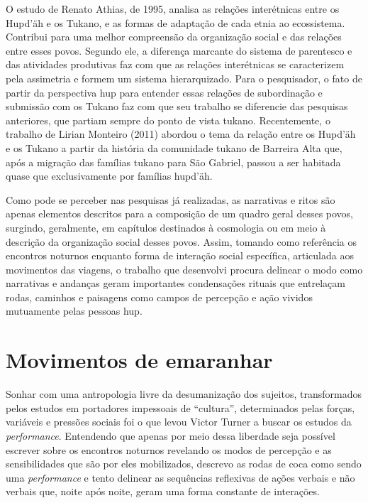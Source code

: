 O estudo de Renato Athias, de 1995, analisa as relações interétnicas
entre os Hupd'äh e os Tukano, e as formas de adaptação de cada etnia ao
ecossistema. Contribui para uma melhor compreensão da organização social
e das relações entre esses povos. Segundo ele, a diferença marcante do
sistema de parentesco e das atividades produtivas faz com que as
relações interétnicas se caracterizem pela assimetria e formem um
sistema hierarquizado. Para o pesquisador, o fato de partir da
perspectiva hup para entender essas relações de subordinação e submissão
com os Tukano faz com que seu trabalho se diferencie das pesquisas
anteriores, que partiam sempre do ponto de vista tukano. Recentemente, o
trabalho de Lirian Monteiro (2011) abordou o tema da relação entre os
Hupd'äh e os Tukano a partir da história da comunidade tukano de
Barreira Alta que, após a migração das famílias tukano para São Gabriel,
passou a ser habitada quase que exclusivamente por famílias hupd'äh.

Como pode se perceber nas pesquisas já realizadas, as narrativas e ritos
são apenas elementos descritos para a composição de um quadro geral
desses povos, surgindo, geralmente, em capítulos destinados à cosmologia
ou em meio à descrição da organização social desses povos. Assim,
tomando como referência os encontros noturnos enquanto forma de
interação social específica, articulada aos movimentos das viagens, o
trabalho que desenvolvi procura delinear o modo como narrativas e
andanças geram importantes condensações rituais que entrelaçam rodas,
caminhos e paisagens como campos de percepção e ação vividos mutuamente
pelas pessoas hup.

\section{Movimentos de emaranhar}\label{movimentos-de-emaranhar}

Sonhar com uma antropologia livre da desumanização dos sujeitos,
transformados pelos estudos em portadores impessoais de ``cultura'',
determinados pelas forças, variáveis e pressões sociais foi o que levou
Victor Turner a buscar os estudos da \emph{performance}. Entendendo que
apenas por meio dessa liberdade seja possível escrever sobre os
encontros noturnos revelando os modos de percepção e as sensibilidades
que são por eles mobilizados, descrevo as rodas de coca como sendo uma
\emph{performance} e tento delinear as sequências reflexivas de ações
verbais e não verbais que, noite após noite, geram uma forma constante
de interações.

